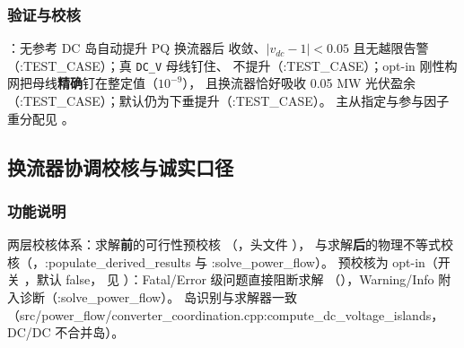 \subsubsection*{验证与校核}
：无参考 DC 岛自动提升 PQ 换流器后
收敛、$|v_{dc}-1|<0.05$ 且无越限告警（:TEST\_CASE）；真 \texttt{DC\_V} 母线钉住、
不提升（:TEST\_CASE）；opt-in 刚性构网把母线\textbf{精确}钉在整定值（$10^{-9}$），
且换流器恰好吸收 0.05 MW 光伏盈余（:TEST\_CASE）；默认仍为下垂提升（:TEST\_CASE）。
主从指定与参与因子重分配见 。

\subsection{换流器协调校核与诚实口径}\label{sec:hybrid-coord}

\subsubsection*{功能说明}
两层校核体系：求解\textbf{前}的可行性预校核
（，头文件
），
与求解\textbf{后}的物理不等式校核（，:populate\_derived\_results 与 :solve\_power\_flow）。
预校核为 opt-in（开关 ，默认 false，
见 ）：Fatal/Error 级问题直接阻断求解
（），Warning/Info 附入诊断（:solve\_power\_flow）。
岛识别与求解器一致（src/power\_flow/converter\_coordination.cpp:compute\_dc\_voltage\_islands，DC/DC 不合并岛）。

